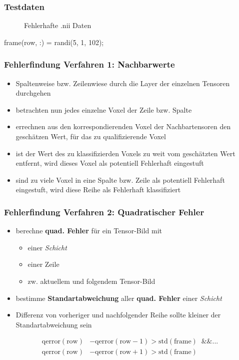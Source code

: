 \documentclass[12pt,a4paper]{beamer}
\begin{document}
\begin{frame}
	\frametitle{Testdaten}
	\begin{figure}
		\centering
		\caption{Fehlerhafte .nii Daten} %
	\end{figure}
	frame(row, :) = randi(5, 1, 102);	
\end{frame}

\begin{frame}
	\frametitle{Fehlerfindung Verfahren 1: Nachbarwerte}
	\begin{itemize}
		\item Spaltenweise bzw. Zeilenwiese  durch die Layer der einzelnen Tensoren durchgehen
		\item betrachten nun jedes einzelne Voxel der Zeile bzw. Spalte
		\item errechnen aus den  korrespondierenden Voxel der Nachbartensoren  den gesch\"atzen Wert, f\"ur das zu qualifizierende Voxel
		\item ist der Wert des zu klassifizierden Voxels zu weit vom gesch\"atzten Wert entfernt, wird dieses Voxel als potentiell Fehlerhaft eingestuft
		\item sind zu viele Voxel in eine Spalte bzw. Zeile als potentiell Fehlerhaft eingestuft, wird diese Reihe als Fehlerhaft klassifiziert
	\end{itemize}
\end{frame}

\begin{frame}
	\frametitle{Fehlerfindung Verfahren 2: Quadratischer Fehler}

	\begin{itemize}
		\item berechne \textbf{quad. Fehler}  für ein Tensor-Bild mit
		\begin{itemize}
			\item einer \textit{Schicht}
			\item einer Zeile 
			\item zw. aktuellem und folgendem Tensor-Bild
		\end{itemize}
		\item bestimme \textbf{Standartabweichung} aller \textbf{quad. Fehler} einer \textit{Schicht}
		\item Differenz von vorheriger und nachfolgender Reihe sollte kleiner der Standartabweichung sein
	\end{itemize}
	
	\begin{align*}
		\text{qerror}(\text{row}) &- \text{qerror}(\text{row}-1)  > \text{std}(\text{frame}) \;\;\&\& ... \\
		\text{qerror}(\text{row}) &- \text{qerror}(\text{row}+1) > \text{std}(\text{frame})
	\end{align*}
\end{frame}
\end{document}
